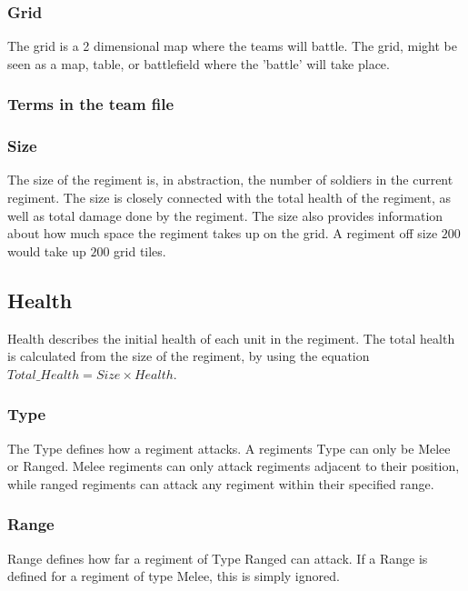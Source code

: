 		\subsubsection{Grid}
		The grid is a 2 dimensional map where the teams will battle.
		The grid, might be seen as a map, table, or battlefield where the 'battle' will take place. 
																		
		\subsubsection{Terms in the team file }
	
		\subsubsection{Size}
		The size of the regiment is, in abstraction, the number of soldiers in the current regiment. 
		The size is closely connected with the total health of the regiment, as well as total damage done by the regiment.
		The size also provides information about how much space the regiment takes up on the grid. A regiment off size $200$ would take up $200$ grid tiles.

		\subsection{Health}
		Health describes the initial health of each unit in the regiment.
		The total health is calculated from the size of the regiment, by using the equation $Total\_Health = Size \times Health$.
		
		\subsubsection{Type}
		The Type defines how a regiment attacks. A regiments Type can only be Melee or Ranged.
		Melee regiments can only attack regiments adjacent to their position, while ranged regiments 
		can attack any regiment within their specified range.
		
		\subsubsection{Range}
		Range defines how far a regiment of Type Ranged can attack. 
		If a Range is defined for a regiment of type Melee, this is simply ignored.
		
